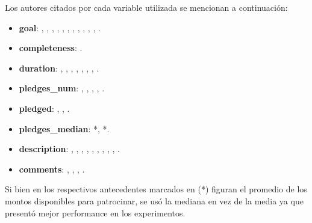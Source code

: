 Los autores citados por cada variable utilizada se mencionan a continuación:
\begin{itemize}
	\item \textbf{goal}: \cite{pr_chen2013kickpredict}, \cite{pr_mitra2014phrases}, \cite{pr_zhou2015projectdesc}, \cite{pr_chen2015predcrowd}, \cite{pr_li2016predcrowd}, \cite{pr_yuan2016textanalytics}, \cite{pr_sawhney2016usingLT}, \cite{pr_kaur2017socmedcrowd}, \cite{pr_kamath2018suplearn}, \cite{pr_yu2018deeplearning}, \cite{pr_jin2019dayssuccess}, \cite{pr_cheng2019deeplearning}.
	\item \textbf{completeness}: \cite{pr_chen2015predcrowd}.
	\item \textbf{duration}: \cite{pr_mitra2014phrases}, \cite{pr_zhou2015projectdesc}, \cite{pr_li2016predcrowd}, \cite{pr_sawhney2016usingLT}, \cite{pr_kaur2017socmedcrowd}, \cite{pr_kamath2018suplearn}, \cite{pr_yu2018deeplearning}, \cite{pr_jin2019dayssuccess}.
	\item \textbf{pledges\_num}: \cite{pr_chen2013kickpredict}, \cite{pr_mitra2014phrases}, \cite{pr_chen2015predcrowd}, \cite{pr_yuan2016textanalytics}, \cite{pr_jin2019dayssuccess}.
	\item \textbf{pledged}: \cite{pr_chen2013kickpredict}, \cite{pr_li2016predcrowd}, \cite{pr_kamath2018suplearn}.
	\item \textbf{pledges\_median}: \cite{pr_chen2015predcrowd}*, \cite{pr_jin2019dayssuccess}*.
	\item \textbf{description}: \cite{pr_mitra2014phrases}, \cite{pr_zhou2015projectdesc}, \cite{pr_yuan2016textanalytics}, \cite{pr_sawhney2016usingLT}, \cite{pr_kamath2018suplearn}, \cite{pr_lee2018contentDL}, \cite{pr_jin2019dayssuccess}, \cite{pr_cheng2019deeplearning}, \cite{pr_chen2019keywords_crowdfunding}, \cite{pr_chaichi2019nlp_3dprinting}.
	\item \textbf{comments}: \cite{pr_li2016predcrowd}, \cite{pr_kaur2017socmedcrowd}, \cite{pr_lee2018contentDL}, \cite{pr_jin2019dayssuccess}.
\end{itemize}

Si bien en los respectivos antecedentes marcados en (*) figuran el promedio de los montos disponibles para patrocinar, se usó la mediana en vez de la media ya que presentó mejor performance en los experimentos.

